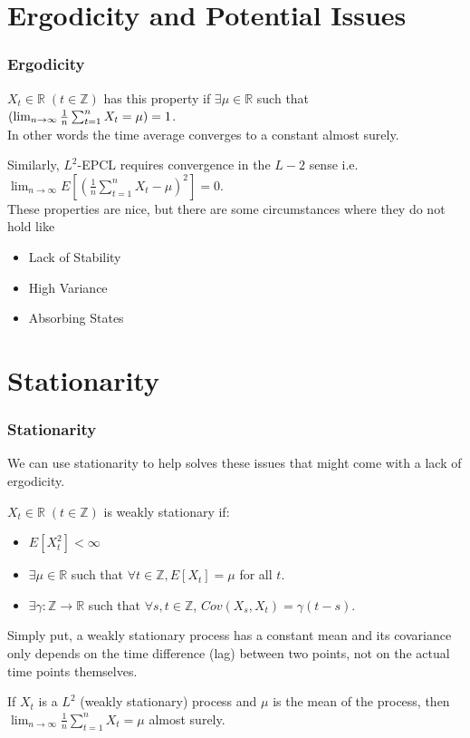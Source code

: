 \documentclass{beamer}
\let\P\relax
\newcommand{\P}{\mathbb{P}}
\begin{document}
\section{Ergodicity and Potential Issues}
\begin{frame}
    \frametitle{Ergodicity}
    \begin{definition}
        $X_t \in \mathbb{R} \; (t \in \mathbb{Z})$ has this property if $\exists \mu \in \mathbb{R}$ such that $
        \P(\lim_{n \to \infty} \frac{1}{n} \sum_{t=1}^{n} X_t = \mu) = 1$.\\
        In other words the time average converges to a constant almost surely.
    \end{definition}
    Similarly, $L^2$-EPCL requires convergence in the $L-2$ sense i.e. $\lim_{n \to \infty} E[(\frac{1}{n} \sum_{t=1}^{n} X_t - \mu)^2] = 0$.\\
    These properties are nice, but there are some circumstances where they do not hold like
    \begin{itemize}
        \item Lack of Stability 
        \item High Variance
        \item Absorbing States
    \end{itemize}
\end{frame}

\section{Stationarity}
\begin{frame}
    \frametitle{Stationarity}
    We can use stationarity to help solves these issues that might come with a lack of ergodicity.\\
    \begin{definition}
        $X_t \in \mathbb{R} \; (t \in \mathbb{Z})$ is weakly stationary if:
        \begin{itemize}
            \item $E[X_t^2] < \infty$
            \item $\exists \mu \in \mathbb{R}$ such that $\forall t \in \mathbb{Z}, E[X_t] = \mu$ for all $t$.
            \item $\exists \gamma: \mathbb{Z} \to \mathbb{R}$ such that $\forall s,t \in \mathbb{Z}$, $Cov(X_s, X_t) = \gamma(t-s)$.
        \end{itemize}
        Simply put, a weakly stationary process has a constant mean and its covariance only depends on the time difference (lag) between two points, not on the actual time points themselves.
    \end{definition}
    \begin{theorem}
        If $X_t$ is a $L^2$ (weakly stationary) process and $\mu$ is the mean of the process, then $\lim_{n \to \infty} \frac{1}{n} \sum_{t=1}^{n} X_t = \mu$ almost surely.
    \end{theorem}
\end{frame}
\end{document}
